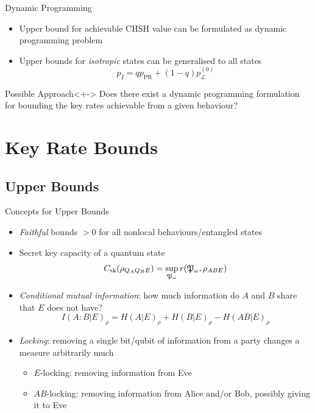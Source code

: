 \documentclass[xcolor=dvipsnames]{beamer}
\newcommand{\?}{\mathrel{?}} %
\newcommand{\Ls}{\mathcal{L}}
\newcommand{\PR}{\mathrm{PR}}
\newcommand{\sk}{\rm sk}
\begin{document}
\begin{frame}{Dynamic Programming}
  \begin{itemize}[<+->]
    \item Upper bound for achievable CHSH value can be formulated as dynamic programming problem
    \item Upper bounds for \emph{isotropic} states can be generalised to all states
      \[ p_I = qp_{\PR} + (1-q)p_{\Ls}^{(0)} \]
  \end{itemize}
  \begin{block}{Possible Approach}<+->
    Does there exist a dynamic programming formulation for bounding the key rates achievable from a given behaviour?
  \end{block}
\end{frame}

\section{Key Rate Bounds}

\subsection{Upper Bounds}

\begin{frame}{Concepts for Upper Bounds}
  \begin{itemize}[<+->]
    \item \emph{Faithful} bounds \(> 0\) for all nonlocal behaviours/entangled states
    \item Secret key capacity of a quantum state
      \[ C_{\sk}(\rho_{Q_A Q_B E}) = \sup_{\mathfrak{P}_{\omega}} 
      r(\mathfrak{P}_{\omega}, \rho_{ABE}) \]
    \item \emph{Conditional mutual information}: how much information do \(A\) and \(B\) share that \(E\) does not have?
        \[ I{(A:B|E)}_{\rho} = H{(A|E)}_{\rho} + H{(B|E)}_{\rho} - H{(AB|E)}_{\rho} \]
    \item \emph{Locking}: removing a single bit/qubit of information from a party changes a measure arbitrarily much
      \begin{itemize}
        \item \(E\)-locking: removing information from Eve
        \item \(AB\)-locking: removing information from Alice and/or Bob, possibly giving it to Eve
      \end{itemize}
  \end{itemize}
\end{frame}
\end{document}

